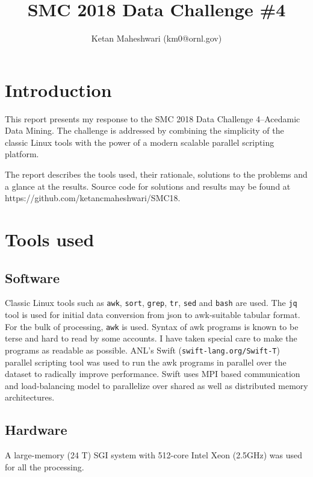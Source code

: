 \documentclass{article}
\title{SMC 2018 Data Challenge \#4}
\author{Ketan Maheshwari (km0@ornl.gov)}
\begin{document}
\maketitle
\section*{Introduction}

This report presents my response to the SMC 2018 Data Challenge 4--Acedamic
Data Mining. The challenge is addressed by combining the simplicity of the
classic Linux tools with the power of a modern scalable parallel scripting
platform.

The report describes the tools used, their rationale, solutions to the problems
and a glance at the results. Source code for solutions and results may be found
at https://github.com/ketancmaheshwari/SMC18.

\section*{Tools used}
\subsection*{Software}
Classic Linux tools such as \texttt{awk}, \texttt{sort}, \texttt{grep},
\texttt{tr}, \texttt{sed} and \texttt{bash} are used.  The \texttt{jq} tool is
used for initial data conversion from json to awk-suitable tabular format. For
the bulk of processing, \texttt{awk} is used. Syntax of awk programs is known
to be terse and hard to read by some accounts. I have taken special care to
make the programs as readable as possible.  ANL's Swift
(\texttt{swift-lang.org/Swift-T}) parallel scripting tool was used to run the
awk programs in parallel over the dataset to radically improve performance.
Swift uses MPI based communication and load-balancing model to parallelize over
shared as well as distributed memory architectures.

\subsection*{Hardware}
A large-memory (24 T) SGI system with 512-core Intel Xeon (2.5GHz) was used for
all the processing.
\end{document}
